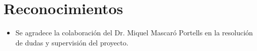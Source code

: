 \newpage

\section*{Reconocimientos}
\begin{itemize}
    \item Se agradece la colaboración del Dr. Miquel Mascaró Portells en la resolución de dudas y supervisión del proyecto.
\end{itemize}
